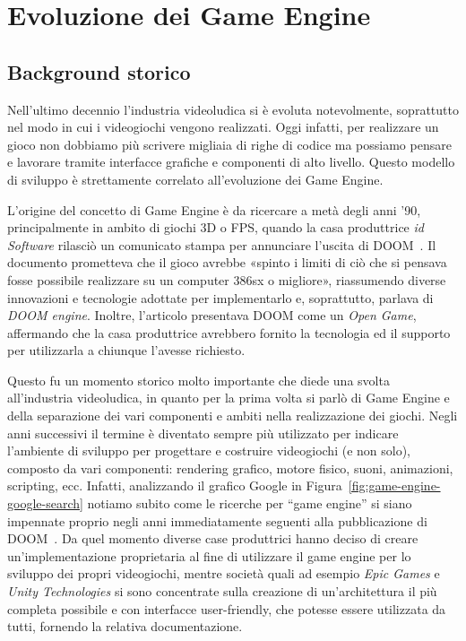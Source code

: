 \chapter{Evoluzione dei Game Engine}
\label{cap:evoluzione}

\section{Background storico}
Nell'ultimo decennio l'industria videoludica si è evoluta notevolmente, soprattutto nel modo in cui i videogiochi vengono realizzati. Oggi infatti, per realizzare un gioco non dobbiamo più scrivere migliaia di righe di codice ma possiamo pensare e lavorare tramite interfacce grafiche e componenti di alto livello. Questo modello di sviluppo è strettamente correlato all'evoluzione dei Game Engine.

L'origine del concetto di Game Engine è da ricercare a metà degli anni '90, principalmente in ambito di giochi 3D o FPS, quando la casa produttrice \emph{id Software} rilasciò un comunicato stampa per annunciare l'uscita di DOOM~\cite{article:hall1992doom}.
Il documento prometteva che il gioco avrebbe «spinto i limiti di ciò che si pensava fosse possibile realizzare su un computer 386sx o migliore», riassumendo diverse innovazioni e tecnologie adottate per implementarlo e, soprattutto, parlava di \emph{DOOM engine}. Inoltre, l'articolo presentava DOOM come un \emph{Open Game}, affermando che la casa produttrice avrebbero fornito la tecnologia ed il supporto per utilizzarla a chiunque l'avesse richiesto.

Questo fu un momento storico molto importante che diede una svolta all'industria videoludica, in quanto per la prima volta si parlò di Game Engine e della separazione dei vari componenti e ambiti nella realizzazione dei giochi. Negli anni successivi il termine è diventato sempre più utilizzato per indicare l'ambiente di sviluppo per progettare e costruire videogiochi (e non solo), composto da vari componenti: rendering grafico, motore fisico, suoni, animazioni, scripting, ecc.
Infatti, analizzando il grafico Google in Figura~\ref{fig:game-engine-google-search} notiamo subito come le ricerche per ``game engine'' si siano impennate proprio negli anni immediatamente seguenti alla pubblicazione di DOOM~\cite{article:lowood2014game}. 
Da quel momento diverse case produttrici hanno deciso di creare un'implementazione proprietaria al fine di utilizzare il game engine per lo sviluppo dei propri videogiochi, mentre società quali ad esempio \emph{Epic Games} e \emph{Unity Technologies} si sono concentrate sulla creazione di un'architettura il più completa possibile e con interfacce user-friendly, che potesse essere utilizzata da tutti, fornendo la relativa documentazione.

